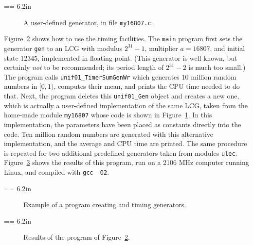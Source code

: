 =\vbox {\hsize = 6.2in
{\smallc
}
}

\begin{figure} \centering {}
\caption {A user-defined generator, in file {\tt my16807.c}.}
\label {fig:my16807}
\end{figure}



Figure~\ref{fig:unif-timing} shows how to use the timing facilities.
The {\tt main} program first sets the generator {\tt gen} to an LCG
with modulus $2^{31}-1$, multiplier $a = 16807$, and initial state 12345,
implemented in floating point.
(This generator is well known, but certainly {\em not\/} to be recommended;
its period length of $2^{31}-2$ is much too small.)
The program calls {\tt unif01\_TimerSumGenWr} which generates 10 million
random numbers in $[0, 1)$, computes their mean, and prints the CPU time
needed to do that.
Next, the program deletes this {\tt unif01\_Gen} object and creates a
new one, which is actually a user-defined implementation of the same LCG,
taken from the home-made module {\tt my16807} whose code is shown in
Figure~\ref{fig:my16807}.
In this implementation, the parameters have been placed as constants
directly into the code.
Ten million random numbers are generated with this alternative
implementation, and the average and CPU time are printed.
The same procedure is repeated for two additional predefined
generators taken from modules {\tt ulec}.
Figure~\ref{fig:unif-timing-res} shows the results of this program,
run on a 2106 MHz computer running Linux, and compiled with {\tt gcc -O2}.



=\vbox {\hsize = 6.2in
{\smallc
}
}

\begin{figure} \centering {}
\caption {Example of a program creating and timing generators.}
\label {fig:unif-timing}
\end{figure}


=\vbox {\hsize = 6.2in
{\smallc
}
}

\begin{figure} \centering {}
\caption {Results of the program of Figure~\ref{fig:unif-timing}.}
\label {fig:unif-timing-res}
\end{figure}


